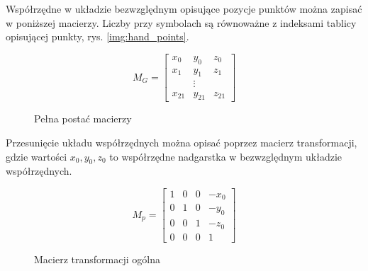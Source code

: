 



\quad Współrzędne w układzie bezwzględnym opisujące pozycje punktów można zapisać w poniższej macierzy. Liczby przy symbolach są równoważne z indeksami tablicy opisującej punkty, rys. \ref{img:hand_points}.

\begin{figure}[H]
    \begin{equation}
        M_G = 
        \begin{bmatrix}
        x_0 & y_0 & z_0 \\
        x_1 & y_1 & z_1 \\
            & \vdots &     \\
        x_{21} & y_{21} & z_{21}
        \end{bmatrix}
    \end{equation}    
    \caption{Pełna postać macierzy}
\end{figure}

\quad Przesunięcie układu współrzędnych można opisać poprzez macierz transformacji, gdzie wartości ${x_0, y_0, z_0}$ to współrzędne nadgarstka w bezwzględnym układzie współrzędnych.  

\begin{figure}[H]
    \begin{equation}
        M_p = 
        \begin{bmatrix}
            1 & 0 & 0 & -x_0 \\
            0 & 1 & 0 & -y_0 \\
            0 & 0 & 1 & -z_0 \\
            0 & 0 & 0 & 1
        \end{bmatrix}
    \end{equation}
    \caption{Macierz transformacji ogólna}
\end{figure}


